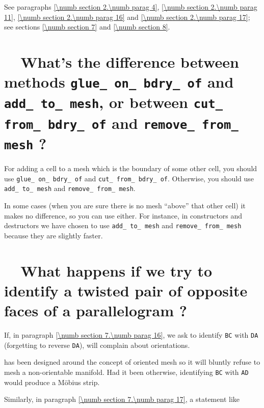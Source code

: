 See paragraphs \ref{\numb section 2.\numb parag 4}, \ref{\numb section 2.\numb parag 11},
\ref{\numb section 2.\numb parag 16} and \ref{\numb section 2.\numb parag 17};
see sections \ref{\numb section 7} and \ref{\numb section 8}.


\section{~~What's the difference between methods {\tt glue\_\,on\_\,bdry\_\,of} and
  {\tt add\_\,to\_\,mesh}, or between {\tt cut\_\,from\_\,bdry\_\,of} and
  {\tt remove\_\,from\_\,mesh} ?}
\label{\numb section 13.\numb parag 4}

For adding a cell to a mesh which is the boundary of some other cell,
you should use {\small\tt glue\_\,on\_\,bdry\_\,of} and {\small\tt cut\_\,from\_\,bdry\_\,of}.
Otherwise, you should use {\small\tt add\_\,to\_\,mesh} and {\small\tt remove\_\,from\_\,mesh}.

In some cases (when you are sure there is no mesh ``above'' that other cell)
it makes no difference, so you can use either.
For instance, in {\small\tt{}} constructors and destructors
we have chosen to use {\small\tt add\_\,to\_\,mesh} and {\small\tt remove\_\,from\_\,mesh}
because they are slightly faster.


\section{~~What happens if we try to identify a twisted pair of
           opposite faces of a parallelogram ?}
\label{\numb section 13.\numb parag 5}

If, in paragraph \ref{\numb section 7.\numb parag 16}, we ask {\maniFEM} to identify
{\small\tt BC} with {\small\tt DA} (forgetting to reverse {\small\tt DA}),
{\maniFEM} will complain about orientations.

\ManiFEM{} has been designed around the concept of oriented mesh so it will
bluntly refuse to mesh a non-orientable manifold.
Had it been otherwise, identifying {\small\tt BC} with {\small\tt AD}
would produce a M\"obius strip.

Similarly, in paragraph \ref{\numb section 7.\numb parag 17}, a statement like

